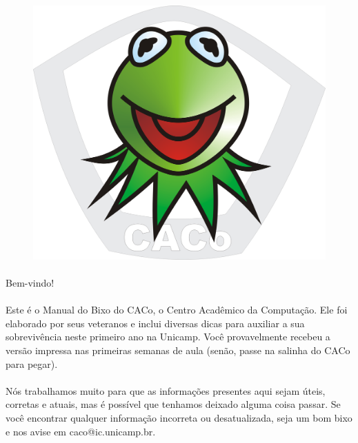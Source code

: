 \documentclass[a4paper,10pt, twocolumn, twoside, titlepage]{article}
\begin{document}
\thispagestyle{empty}

\hfill
\pagebreak[4]


\onecolumn
\thispagestyle{empty}

\begin{figure}[H]
    \centering
    \includegraphics[scale=0.45,keepaspectratio=true]{img/caco-logo-grande.png}
\end{figure}

\paragraph{}
Bem-vindo!

\paragraph{}
Este é o Manual do Bixo do CACo, o Centro Acadêmico da Computação.
Ele foi elaborado por seus veteranos e inclui diversas dicas para auxiliar a sua
sobrevivência neste primeiro ano na Unicamp.
Você provavelmente recebeu a versão impressa nas primeiras semanas de aula (senão, passe na salinha do CACo para pegar).

\paragraph{}
Nós trabalhamos muito para que as informações presentes aqui sejam úteis,
corretas e atuais, mas é possível que tenhamos deixado alguma coisa passar. Se
você encontrar qualquer informação incorreta ou desatualizada, seja um bom bixo
e nos avise em caco@ic.unicamp.br.
\end{document}
